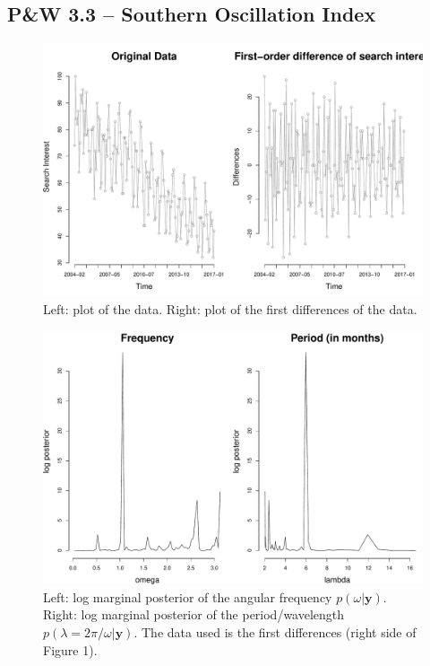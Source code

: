 \documentclass[12pt]{article}
\newcommand{\m}[1]{\mathbf{\bm{#1}}}
\begin{document}
\subsection*{P\&W 3.3 -- Southern Oscillation Index}

\begin{figure}[H]
\begin{center}
\includegraphics[scale=0.32]{figs/data.pdf}
\end{center}
\caption{Left: plot of the data. Right: plot of the first differences of the data.}
\end{figure}

\begin{figure}[H]
\begin{center}
\includegraphics[scale=0.32]{figs/spectral.pdf}
\end{center}
\caption{Left: log marginal posterior of the angular frequency $p(\omega|\m{y})$. Right: log marginal posterior of the period/wavelength $p(\lambda=2\pi/\omega|\m{y})$. The data used is the first differences (right side of Figure 1).}
\end{figure}
\end{document}
